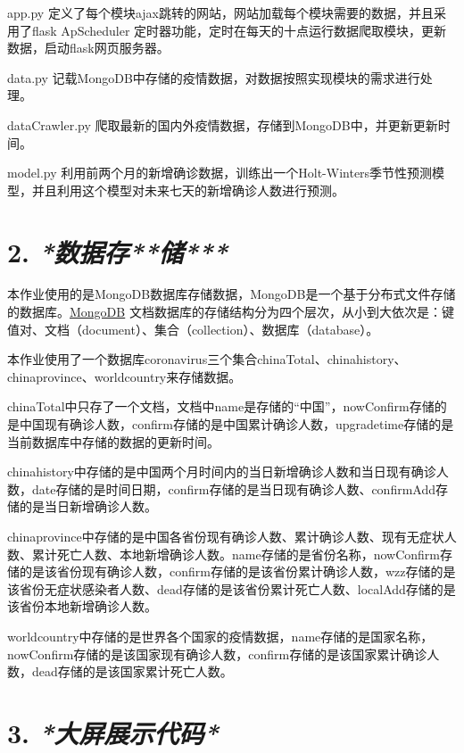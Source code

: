 \documentclass[
]{article}
\begin{document}
app.py
定义了每个模块ajax跳转的网站，网站加载每个模块需要的数据，并且采用了flask
ApScheduler
定时器功能，定时在每天的十点运行数据爬取模块，更新数据，启动flask网页服务器。

data.py 记载MongoDB中存储的疫情数据，对数据按照实现模块的需求进行处理。

dataCrawler.py
爬取最新的国内外疫情数据，存储到MongoDB中，并更新更新时间。

model.py
利用前两个月的新增确诊数据，训练出一个Holt-Winters季节性预测模型，并且利用这个模型对未来七天的新增确诊人数进行预测。

\hypertarget{2-ux6570ux636eux5b58ux50a8}{%
\section{\texorpdfstring{\textbf{2.}
\emph{\textbf{*数据存*}\textbf{}*储***}}{2. *数据存**储***}}\label{2-ux6570ux636eux5b58ux50a8}}

本作业使用的是MongoDB数据库存储数据，MongoDB是一个基于分布式文件存储
的数据库。\href{http://c.biancheng.net/mongodb/}{MongoDB}
文档数据库的存储结构分为四个层次，从小到大依次是：键值对、文档（document）、集合（collection）、数据库（database）。

本作业使用了一个数据库coronavirus三个集合chinaTotal、chinahistory、chinaprovince、worldcountry来存储数据。

chinaTotal中只存了一个文档，文档中name是存储的``中国''，nowConfirm存储的是中国现有确诊人数，confirm存储的是中国累计确诊人数，upgradetime存储的是当前数据库中存储的数据的更新时间。

chinahistory中存储的是中国两个月时间内的当日新增确诊人数和当日现有确诊人数，date存储的是时间日期，confirm存储的是当日现有确诊人数、confirmAdd存储的是当日新增确诊人数。

chinaprovince中存储的是中国各省份现有确诊人数、累计确诊人数、现有无症状人数、累计死亡人数、本地新增确诊人数。name存储的是省份名称，nowConfirm存储的是该省份现有确诊人数，confirm存储的是该省份累计确诊人数，wzz存储的是该省份无症状感染者人数、dead存储的是该省份累计死亡人数、localAdd存储的是该省份本地新增确诊人数。

worldcountry中存储的是世界各个国家的疫情数据，name存储的是国家名称，nowConfirm存储的是该国家现有确诊人数，confirm存储的是该国家累计确诊人数，dead存储的是该国家累计死亡人数。

\hypertarget{3-ux5927ux5c4fux5c55ux793aux4ee3ux7801}{%
\section{\texorpdfstring{\textbf{3.}
\emph{\textbf{*大屏展示代码*}}}{3. *大屏展示代码*}}\label{3-ux5927ux5c4fux5c55ux793aux4ee3ux7801}}
\end{document}
